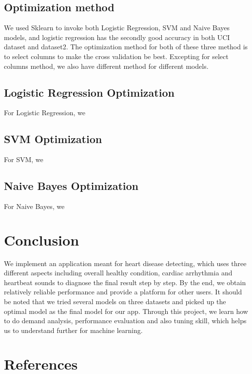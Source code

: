 \documentclass[letterpaper]{article} %
\begin{document}
\subsection{Optimization method}

We used Sklearn to invoke both Logistic Regression, SVM and Naive Bayes models, and logistic regression has the secondly good accuracy in both UCI dataset and dataset2. The optimization method for both of these three method is to select columns to make the cross validation be best. Excepting for select columns method, we also have different method for different models.

\subsection{Logistic Regression Optimization}

For Logistic Regression, we 

\subsection{SVM Optimization}

For SVM, we

\subsection{Naive Bayes Optimization}

For Naive Bayes, we

\section{Conclusion}

We implement an application meant for heart disease detecting, which uses three different aspects including overall healthy condition, cardiac arrhythmia and heartbeat sounds to diagnose the final result step by step. By the end, we obtain relatively reliable performance and provide a platform for other users. It should be noted that we tried several  models on three datasets and picked up the optimal model as the final model for our app. Through this project, we learn how to do demand analysis, performance evaluation and also tuning skill, which helps us to understand further for machine learning.

\section{References}
\end{document}
